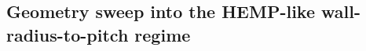 %
%
\subsection{Geometry sweep into the HEMP-like wall-radius-to-pitch regime}
\label{sec:l1a-sweep-v3-screening}

